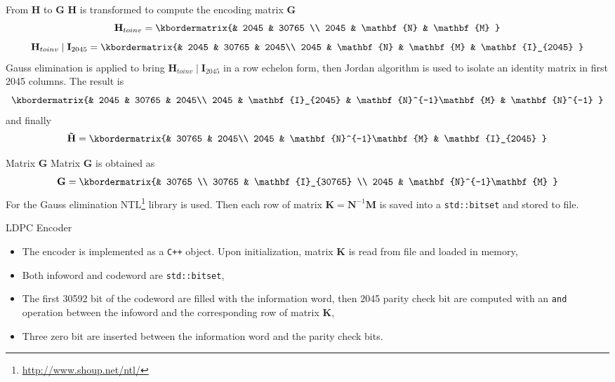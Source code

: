 \documentclass[pdf]
          {beamer}
\begin{document}
\begin{frame}{From $\mathbf{H}$ to $\mathbf{G}$}
	$\mathbf{H}$ is transformed to compute the encoding matrix $\mathbf{G}$
	\begin{equation*}
		\mathbf{H}_{to inv} = 
			\kbordermatrix{%
					 & 2045 	  & 30765 \\
				2045 & \mathbf{N} & \mathbf{M}
			}
	\end{equation*}
	\begin{equation*}
		\mathbf{H}_{to inv} \; | \; \mathbf{I}_{2045} = 
			\kbordermatrix{%
					 & 2045 	  & 30765  & 2045\\
				2045 & \mathbf{N} & \mathbf{M} & \mathbf{I}_{2045}
			}
	\end{equation*}
	\small{Gauss elimination is applied to bring $\mathbf{H}_{toinv} \; | \; \mathbf{I}_{2045}$ in a row echelon form, then Jordan algorithm is used to isolate an identity matrix in first 2045 columns. The result is}
	\begin{equation*}
			\kbordermatrix{%
					 & 2045 	  & 30765  & 2045\\
				2045 & \mathbf{I}_{2045} & \mathbf{N}^{-1}\mathbf{M} & \mathbf{N}^{-1}
			}
	\end{equation*}
	\small{and finally}
	\begin{equation*}
			\mathbf{\tilde{H}} = 
			\kbordermatrix{%
					 & 30765  & 2045\\
				2045 & \mathbf{N}^{-1}\mathbf{M} & \mathbf{I}_{2045} 
			}
	\end{equation*}
\end{frame}
\renewcommand{\arraystretch}{1.5}
\begin{frame}{Matrix $\mathbf{G}$}
	Matrix $\mathbf{G}$ is obtained as 
	\begin{equation*}
			\mathbf{G} = 
			\kbordermatrix{%
					 & 30765 \\
				30765 & \mathbf{I}_{30765} \\ 
				2045 &  \mathbf{N}^{-1}\mathbf{M}  
			}
	\end{equation*}
	For the Gauss elimination NTL\footnote{\url{http://www.shoup.net/ntl/}} library is used. Then each row of matrix $\mathbf{K} = \mathbf{N}^{-1}\mathbf{M}$ is saved into a \texttt{std::bitset} and stored to file. 
\end{frame}

\begin{frame}{LDPC Encoder}
\begin{itemize}
	\item The encoder is implemented as a \texttt{C++} object. Upon initialization, matrix $\mathbf{K}$ is read from file and loaded in memory, 
	\item Both infoword and codeword are \texttt{std::bitset},
	\item The first 30592 bit of the codeword are filled with the information word, then 2045 parity check bit are computed with an \texttt{and} operation between the infoword and the corresponding row of matrix $\mathbf{K}$,
	\item Three zero bit are inserted between the information word and the parity check bits.
\end{itemize}
\end{frame}
\end{document}
